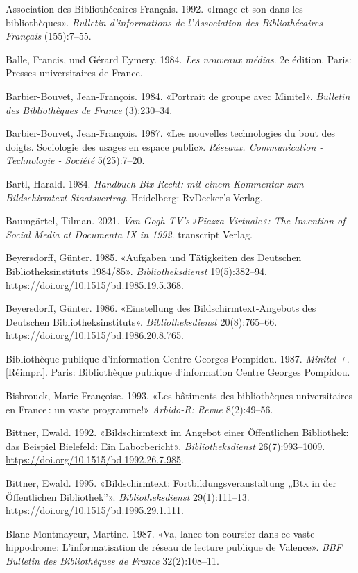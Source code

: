 \documentclass[a4paper,
fontsize=11pt,
oneside,
numbers=noperiodatend,
parskip=half-,
bibliography=totoc,
final
]{scrartcl}
\begin{document}
Association des Bibliothécaires Français. 1992. «Image et son dans les
bibliothèques». \emph{Bulletin d'informations de l'Association des
Bibliothécaires Français} (155):7--55.

Balle, Francis, und Gérard Eymery. 1984. \emph{Les nouveaux médias}. 2e
édition. Paris: Presses universitaires de France.

Barbier-Bouvet, Jean-François. 1984. «Portrait de groupe avec Minitel».
\emph{Bulletin des Bibliothèques de France} (3):230--34.

Barbier-Bouvet, Jean-François. 1987. «Les nouvelles technologies du bout
des doigts. Sociologie des usages en espace public». \emph{Réseaux.
Communication - Technologie - Société} 5(25):7--20.

Bartl, Harald. 1984. \emph{Handbuch Btx-Recht: mit einem Kommentar zum
Bildschirmtext-Staatsvertrag}. Heidelberg: RvDecker's Verlag.

Baumgärtel, Tilman. 2021. \emph{Van Gogh TV's\,»Piazza Virtuale«: The
Invention of Social Media at Documenta IX in 1992}. transcript Verlag.

Beyersdorff, Günter. 1985. «Aufgaben und Tätigkeiten des Deutschen
Bibliotheksinstituts 1984/85». \emph{Bibliotheksdienst} 19(5):382--94.
\url{https://doi.org/10.1515/bd.1985.19.5.368}.

Beyersdorff, Günter. 1986. «Einstellung des Bildschirmtext-Angebots des
Deutschen Bibliotheksinstituts». \emph{Bibliotheksdienst} 20(8):765--66.
\url{https://doi.org/10.1515/bd.1986.20.8.765}.

Bibliothèque publique d'information Centre Georges Pompidou. 1987.
\emph{Minitel +}. {[}Réimpr.{]}. Paris: Bibliothèque publique
d'information Centre Georges Pompidou.

Bisbrouck, Marie-Françoise. 1993. «Les bâtiments des bibliothèques
universitaires en France\,: un vaste programme!» \emph{Arbido-R: Revue}
8(2):49--56.

Bittner, Ewald. 1992. «Bildschirmtext im Angebot einer Öffentlichen
Bibliothek: das Beispiel Bielefeld: Ein Laborbericht».
\emph{Bibliotheksdienst} 26(7):993--1009.
\url{https://doi.org/10.1515/bd.1992.26.7.985}.

Bittner, Ewald. 1995. «Bildschirmtext: Fortbildungsveranstaltung „Btx in
der Öffentlichen Bibliothek''». \emph{Bibliotheksdienst} 29(1):111--13.
\url{https://doi.org/10.1515/bd.1995.29.1.111}.

Blanc-Montmayeur, Martine. 1987. «Va, lance ton coursier dans ce vaste
hippodrome: L'infor\-matisation de réseau de lecture publique de Valence».
\emph{BBF Bulletin des Bibliothèques de France} 32(2):108--11.
\end{document}
